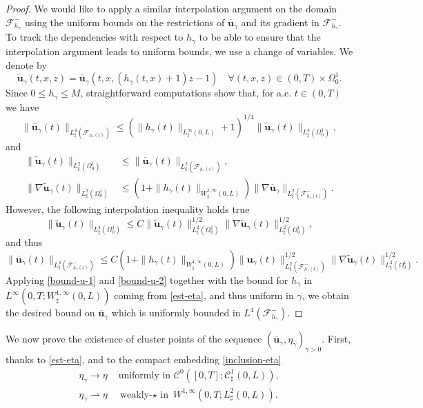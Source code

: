 \documentclass[JEP,XML,SOM,Unicode,NoFloatCountersInSection]{cedram}
\let\mathcal\mathscr
\theoremstyle{remark}
\theoremstyle{definition}
\newcommand{\ug}{\boldsymbol{u}}
\begin{document}
\begin{proof}
We would like to apply a similar interpolation argument on the domain $\mathcal F_{h_{\gamma}}^{-}$ using the uniform bounds on the restrictions of $\overline{\ug}_{\gamma}$ and its gradient in $\mathcal F_{h_{\gamma}}^{-}$. To track the dependencies with respect to $h_{\gamma}$ to be able to ensure that the interpolation argument leads to uniform bounds, we use a change of variables. We denote by
\[
\tilde{\ug}_{\gamma}(t,x,z) = \overline{\ug}_{\gamma}(t,x,(h_{\gamma}(t,x) + 1)z - 1 ) \quad \forall (t,x,z) \in (0,T) \times \Omega_0^1.
\]
Since $0 \leq h_{\gamma} \leq M$, straightforward computations show that, for a.e. $t \in (0,T)$ we have
\[
\|\overline{\ug}_{\gamma}(t)\|_{L_\sharp^4(\mathcal F_{h_{\gamma}(t)})} \leq (\|h_{\gamma}(t)\|_{L^{\infty}_{\sharp}(0,L)}+1)^{1/4} \|\tilde{\ug}_{\gamma}(t)\|_{L_\sharp^4( \Omega_0^1)},
\]
and
\begin{align*}
\|\tilde{\ug}_{\gamma}(t)\|_{L_\sharp^2( \Omega_0^1)} & \leq \|\overline{\ug}_{\gamma}(t)\|_{L_\sharp^2(\mathcal F_{h_{\gamma}(t)})}, \\
\|\nabla \tilde{\ug}_{\gamma}(t)\|_{L_\sharp^2( \Omega_0^1)} & \leq (1+ \|h_{\gamma}(t)\|_{W^{1,\infty}_{\sharp}(0,L)}) \|\nabla \overline{\ug}_{\gamma}\|_{L_\sharp^2(\mathcal F^-_{h_{\gamma}(t)})}.
\end{align*}
However, the following interpolation inequality holds true
\[
\|\tilde{\ug}_{\gamma}(t)\|_{L_\sharp^4( \Omega_0^1)} \leq C \|\tilde{\ug}_{\gamma}(t)\|^{1/2}_{L_\sharp^2( \Omega_0^1)}\|\nabla \tilde{\ug}_{\gamma}(t)\|^{1/2}_{L_\sharp^2( \Omega_0^1)},
\]
and thus
\[
\|\overline{\ug}_{\gamma}(t)\|_{L_\sharp^4(\mathcal F^{-}_{h_{\gamma}(t)})} \leq C(1+ \|h_{\gamma}(t)\|_{W^{1,\infty}_{\sharp}(0,L)}) \|{\ug}_{\gamma}(t)\|^{1/2}_{L_\sharp^2(\mathcal F^{-}_{h_{\gamma}(t)})}\|\nabla \tilde{\ug}_{\gamma}(t)\|^{1/2}_{L_\sharp^2(\Omega_0^1)}.
\]
Applying \eqref{bound-u-1} and \eqref{bound-u-2} together with the bound for
$h_{\gamma}$ in $L^{\infty}(0,T;W^{1,\infty}_{\sharp}(0,L))$ coming from \eqref{est-eta}, and thus uniform in $\gamma$, we obtain the desired bound on $\overline{\ug}_{\gamma}$ which is uniformly bounded in $L^4(\mathcal F^{-}_{h_{\gamma}})$. \end{proof}

We now prove the existence of cluster points of the sequence $(\overline{\ug}_{\gamma},\eta_{\gamma})_{\gamma >0}$. First, thanks to \eqref{est-eta}, and to the compact embedding \eqref{inclusion-eta}
\[
\begin{split}\textstyle
\eta_{\gamma}\to\eta& \text{ uniformly in }\mathcal{C}^{0}([0,T];\mathcal{C}^{1}_{\sharp}(0,L)),\\
\eta_{\gamma}\rightharpoonup\eta& \text{ weakly-$\star$ in }W^{1,\infty}(0,T;L^2_{\sharp}(0,L)).
\end{split}
\]
\end{document}
